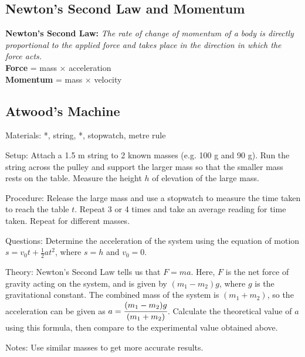 \begin{multicols}{2}

\section*{Newton's Second Law and Momentum}
\textbf{Newton's Second Law:} \emph{The rate of change of momentum of a body is directly proportional to the applied force and takes place in the direction in which the force acts.}\\
\textbf{Force} = mass $\times$ acceleration\\
\textbf{Momentum} = mass $\times$ velocity

\subsection{Atwood's Machine}


\begin{description*}
\item[Materials:]{*, string, *, stopwatch, metre rule}
\item[Setup:]{Attach a 1.5 m string to 2 known masses (e.g. 100 g and 90 g). Run the string across the pulley and support the larger mass so that the smaller mass rests on the table. Measure the height $h$ of elevation of the large mass.}
\item[Procedure:]{Release the large mass and use a stopwatch to measure the time taken to reach the table $t$. Repeat 3 or 4 times and take an average reading for time taken. Repeat for different masses.}
\item[Questions:]{Determine the acceleration of the system using the equation of motion $s=v_0t+\frac{1}{2}at^2$, where $s=h$ and $v_0=0$.}
\item[Theory:]{Newton's Second Law tells us that $F=ma$. Here, $F$ is the net force of gravity acting on the system, and is given by $(m_1-m_2)g$, where $g$ is the gravitational constant. The combined mass of the system is $(m_1+m_2)$, so the acceleration can be given as $a=\cfrac{(m_1-m_2)g}{(m_1+m_2)}$. Calculate the theoretical value of $a$ using this formula, then compare to the experimental value obtained above.}
\item[Notes:]{Use similar masses to get more accurate results.}
\end{description*}


\end{multicols}

